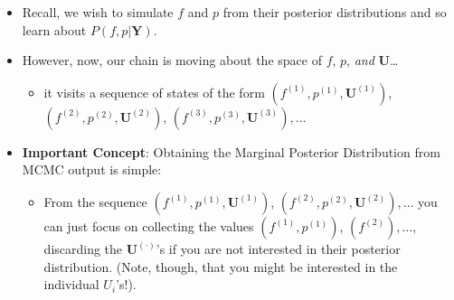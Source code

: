 \begin{itemize}
\item Recall, we wish to simulate $f$ and $p$ from their posterior distributions and so learn about $P(f,p|\bm{Y})$.
\item However, now, our chain is moving about the space of $f$, $p$, {\em and} $\bm{U}$\ldots
\begin{itemize}
\item it visits a sequence of states of the form $(f^{(1)},p^{(1)},\bm{U}^{(1)})$, $(f^{(2)},p^{(2)},\bm{U}^{(2)})$, $(f^{(3)},p^{(3)},\bm{U}^{(3)}), \ldots$
\end{itemize}
\mbox{}\vspace*{.25in}
\item {\bf Important Concept}: Obtaining the Marginal Posterior Distribution from MCMC output is simple:
\begin{itemize}
\item From the sequence $(f^{(1)},p^{(1)},\bm{U}^{(1)})$, $(f^{(2)},p^{(2)},\bm{U}^{(2)}),\ldots$ you can just focus on collecting the values $(f^{(1)},p^{(1)})$, $(f^{(2)}),\ldots$, discarding the $\bm{U}^{(\cdot)}$'s if you are not interested in their posterior distribution.  (Note, though, that you might be interested in the individual $U_i$'s!).
\end{itemize}
\end{itemize}



